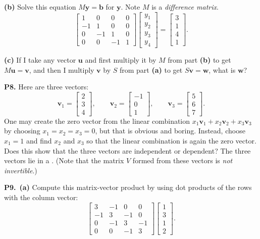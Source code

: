 \documentclass[12pt]{amsart}
\newcommand{\bb}{\bm{b}}
\newcommand{\bu}{\bm{u}}
\newcommand{\bv}{\bm{v}}
\newcommand{\bw}{\bm{w}}
\newcommand{\by}{\bm{y}}
\newcommand{\prob}[1]{\bigskip\noindent\textbf{#1}\quad }
\newcommand{\epart}[1]{\medskip\noindent\textbf{(#1)}\quad }
\newcommand{\ppart}[1]{\,\textbf{(#1)}\quad }
\begin{document}
\epart{b} Solve this equation $M \by = \bb$ for $\by$.  Note $M$ is a \emph{difference matrix}.
    $$\begin{bmatrix} 1 & 0 & 0 & 0 \\ -1 & 1 & 0 & 0 \\ 0 & -1 & 1 & 0 \\ 0 & 0 & -1 & 1 \end{bmatrix} \begin{bmatrix} y_1 \\ y_2 \\ y_3 \\ y_4 \end{bmatrix} = \begin{bmatrix} 3 \\ 1 \\ 4 \\ 1 \end{bmatrix}.$$

\epart{c} If I take any vector $\bu$ and first multiply it by $M$ from part \textbf{(b)} to get $M\bu=\bv$, and then I multiply $\bv$ by $S$ from part \textbf{(a)} to get $S\bv=\bw$, what is $\bw$?

\prob{P8.}  Here are three vectors:
    $$\bv_1 = \begin{bmatrix} 2 \\ 3 \\ 4 \end{bmatrix}, \qquad \bv_2 = \begin{bmatrix} -1 \\ 0 \\ 1 \end{bmatrix}, \qquad \bv_3 = \begin{bmatrix} 5 \\ 6 \\ 7 \end{bmatrix}.$$
One may create the zero vector from the linear combination $x_1 \bv_1 + x_2 \bv_2 + x_3 \bv_3$ by choosing $x_1=x_2=x_3=0$, but that is obvious and boring.  Instead, choose $x_1=1$ and find $x_2$ and $x_3$ so that the linear combination is again the zero vector.  Does this show that the three vectors are independent or dependent?  The three vectors lie in a \underline{\phantom{kdafjlas afds}}.  (Note that the matrix $V$ formed from these vectors is \emph{not invertible}.)

\prob{P9.}  \ppart{a} Compute this matrix-vector product by using dot products of the rows with the column vector:
    $$\begin{bmatrix} 3 & -1 & 0 & 0 \\ -1 & 3 & -1 & 0 \\ 0 & -1 & 3 & -1 \\ 0 & 0 & -1 & 3 \end{bmatrix} \begin{bmatrix} 1 \\ 3 \\ 1 \\ 2 \end{bmatrix}.$$
\end{document}
